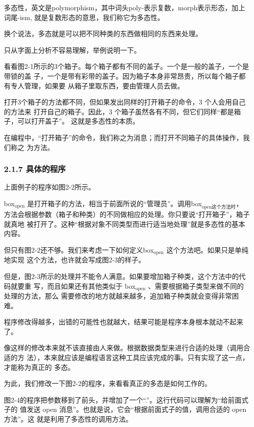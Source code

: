 \documentclass[11pt]{ctexart}
\begin{document}
多态性，英文是polymorphism，其中词头poly-表示复数，morph表示形态，加上词尾-ism,
就是复数形态的意思，我们称它为多态性。

换个说法，多态就是可以把不同种类的东西做相同的东西来处理。

只从字面上分析不容易理解，举例说明一下。

看看图2-1所示的3个箱子。每个箱子都有不同的盖子。一个是一般的盖子，一个是带锁的盖
子，一个是带有彩带的盖子。因为箱子本身非常昂贵，所以每个箱子都有专人管理，如果要
从箱子里取东西，要由管理人员去做。

打开3个箱子的方法都不同，但如果发出同样的打开箱子的命令，3 个人会用自己的方法来
打开自己的箱子。因此，3 个箱子虽然各有不同，但它们同样“都是箱子，可以打开盖子”。
这就是多态性的本质。

在编程中，“打开箱子”的命令，我们称之为消息；而打开不同箱子的具体操作，我们称之
为方法。

\subsubsection{2.1.7 具体的程序}
\label{sec:orgcea16fc}

上面例子的程序如图2-2所示。

box\(_{\text{open}}\) 是打开箱子的方法，相当于前面所说的“管理员”。调用box\(_{\text{open这个方法时}}\)，
方法会根据参数（箱子和种类）的不同做相应的处理。你只要说“打开箱子”，箱子就真地
被打开了。这种“根据对象不同类型而进行适当地处理”就是多态性的基本内容。

但只有图2-2还不够。我们来考虑一下如何定义box\(_{\text{open}}\) 这个方法吧。如果只是单纯地实现
这个方法，也许就会写成图2-3的样子。

但是，图2-3所示的处理并不能令人满意。如果要增加箱子种类，这个方法中的代码就要重
写，而且如果还有其他类似于 box\(_{\text{open}}\) 、需要根据箱子类型来做不同的处理的方法，那么
需要修改的地方就越来越多，追加箱子种类就会变得非常困难。

程序修改得越多，出错的可能性也就越大，结果可能是程序本身根本就动不起来了。

像这样的修改本来就不该直接由人来做。根据数据类型来进行合适的处理（调用合适的方
法），本来就应该是编程语言这种工具应该完成的事。只有实现了这一点，才能称为真正的
多态。

为此，我们修改一下图2-2的程序，来看看真正的多态是如何工作的。

图2-4的程序把参数移到了前头，并增加了一个“.”。这行代码可以理解为“给前面式子的
值发送 open 消息”。也就是说，它会“根据前面式子的值，调用合适的 open 方法”。这
就是利用了多态性的调用方法。
\end{document}
